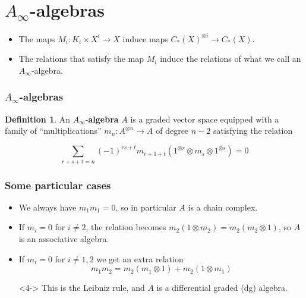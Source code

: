\documentclass{beamer}
\theoremstyle{definition}
\newtheorem{defi}{Definition}
\begin{document}
\section{$A_\infty$-algebras}
\begin{frame}
\begin{itemize}
\item<1-> The maps $M_i:K_i\times X^i\to X$ induce maps $C_*(X)^{\otimes i}\to C_*(X)$.

\item<2-> The relations that satisfy the map $M_i$ induce the relations of what we call an $A_\infty$-algebra.
\end{itemize}
\end{frame}
\begin{frame}
\frametitle{$A_\infty$-algebras}
\begin{defi}
An $A_\infty$-\textbf{algebra} $A$ is a graded vector space equipped with a family of ``multiplications'' $m_n:A^{\otimes n}\to A$ of degree $n-2$ satisfying the relation %

\[\sum_{r+s+t=n}(-1)^{rs+t}m_{r+1+t}(1^{\otimes r}\otimes m_s\otimes 1^{\otimes s})=0\] %
\end{defi}
\end{frame}





\begin{frame}
\frametitle{Some particular cases}
\begin{itemize}
\item<1-> We always have $m_1m_1=0$, so in particular $A$ is a chain complex.%
\item<2-> If $m_i=0$ for $i\neq 2$, the relation becomes $m_2(1\otimes m_2)=m_2(m_2\otimes 1)$, so $A$ is an associative algebra.
\item<3-> If $m_i=0$ for $i\neq 1,2$ we get an extra relation $$m_1m_2=m_2(m_1\otimes 1)+m_2(1\otimes m_1)$$ %
\item[]<4-> This is the Leibniz rule, and $A$ is a differential graded (dg) algebra.
\end{itemize}
\end{frame}
\end{document}
